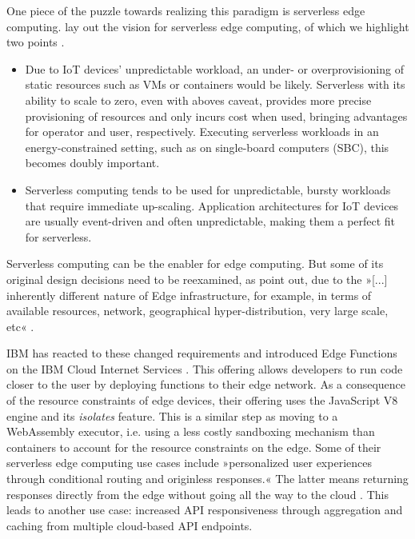 One piece of the puzzle towards realizing this paradigm is serverless edge computing. \citeauthor{Aslanpour2021} lay out the vision for serverless edge computing, of which we highlight two points \cite{Aslanpour2021}.

\begin{itemize}
    \item Due to IoT devices' unpredictable workload, an under- or overprovisioning of static resources such as VMs or containers would be likely. Serverless with its ability to scale to zero, even with aboves caveat, provides more precise provisioning of resources and only incurs cost when used, bringing advantages for operator and user, respectively. Executing serverless workloads in an energy-constrained setting, such as on single-board computers (SBC), this becomes doubly important.
    \item Serverless computing tends to be used for unpredictable, bursty workloads that require immediate up-scaling. Application architectures for IoT devices are usually event-driven and often unpredictable, making them a perfect fit for serverless.
\end{itemize}

Serverless computing can be the enabler for edge computing. But some of its original design decisions need to be reexamined, as \citeauthor{Nastic2018} point out, due to the »[...] inherently different nature of Edge infrastructure, for example, in terms of available resources, network, geographical hyper-distribution, very large scale, etc« \cite{Nastic2018}.

IBM has reacted to these changed requirements and introduced Edge Functions on the IBM Cloud Internet Services \cite{Farid2019}. This offering allows developers to run code closer to the user by deploying functions to their edge network. As a consequence of the resource constraints of edge devices, their offering uses the JavaScript V8 engine and its \emph{isolates} feature. This is a similar step as moving to a WebAssembly executor, i.e. using a less costly sandboxing mechanism than containers to account for the resource constraints on the edge. Some of their serverless edge computing use cases include »personalized user experiences through conditional routing and originless responses.« The latter means returning responses directly from the edge without going all the way to the cloud \cite{IBM2021}. This leads to another use case: increased API responsiveness through aggregation and caching from multiple cloud-based API endpoints.

